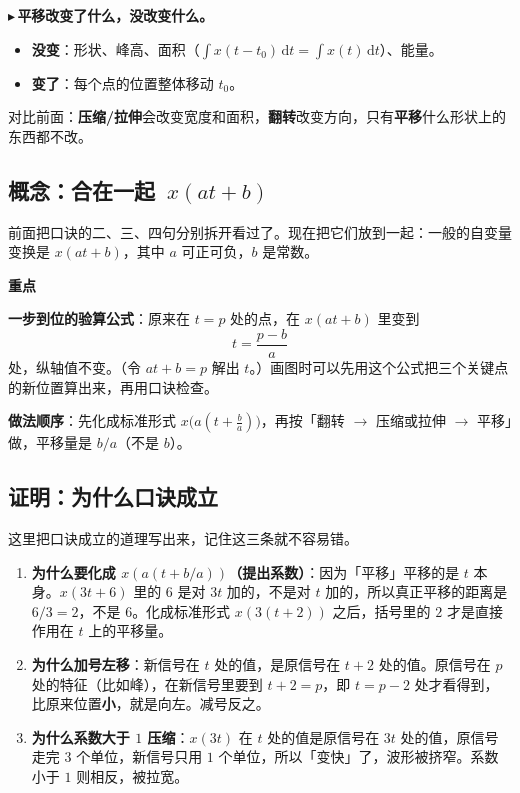 \documentclass[UTF8,a4paper,11pt]{ctexart}
\newenvironment{remember}{\begin{rememberbox}\textbf{重点}\par\smallskip}{\end{rememberbox}}
\renewcommand{\d}{\,\mathrm{d}}
\newcounter{ex}[section]
\newcommand{\point}[1]{\par\addvspace{1ex}\noindent\textcolor{ptteal}{$\blacktriangleright$\,\textbf{#1}}\ }
\renewcommand{\paragraph}[1]{\point{#1}}
\begin{document}
\paragraph{平移改变了什么，没改变什么。}
\begin{itemize}[nosep]
\item \textbf{没变}：形状、峰高、面积（$\int x(t-t_0)\d t=\int x(t)\d t$）、能量。
\item \textbf{变了}：每个点的位置整体移动 $t_0$。
\end{itemize}
对比前面：\textbf{压缩/拉伸}会改变宽度和面积，\textbf{翻转}改变方向，只有\textbf{平移}什么形状上的东西都不改。
\subsection{\texorpdfstring{概念：合在一起~$x(at+b)$}{概念：合在一起 x(at+b)}}\label{sec:combo}

前面把口诀的二、三、四句分别拆开看过了。现在把它们放到一起：一般的自变量变换是 $x(at+b)$，其中 $a$ 可正可负，$b$ 是常数。
\begin{remember}
\textbf{一步到位的验算公式}：原来在 $t=p$ 处的点，在 $x(at+b)$ 里变到
\[
t=\frac{p-b}{a}
\]
处，纵轴值不变。（令 $at+b=p$ 解出 $t$。）画图时可以先用这个公式把三个关键点的新位置算出来，再用口诀检查。
\end{remember}

\textbf{做法顺序}：先化成标准形式 $x\bigl(a(t+\tfrac ba)\bigr)$，再按「翻转 $\to$ 压缩或拉伸 $\to$ 平移」做，平移量是 $b/a$（不是 $b$）。

\subsection{证明：为什么口诀成立}\label{sec:proof}
这里把口诀成立的道理写出来，记住这三条就不容易错。

\begin{enumerate}
\item \textbf{为什么要化成 $x(a(t+b/a))$（提出系数）}：因为「平移」平移的是 $t$ 本身。$x(3t+6)$ 里的 $6$ 是对 $3t$ 加的，不是对 $t$ 加的，所以真正平移的距离是 $6/3=2$，不是 $6$。化成标准形式 $x(3(t+2))$ 之后，括号里的 $2$ 才是直接作用在 $t$ 上的平移量。
\item \textbf{为什么加号左移}：新信号在 $t$ 处的值，是原信号在 $t+2$ 处的值。原信号在 $p$ 处的特征（比如峰），在新信号里要到 $t+2=p$，即 $t=p-2$ 处才看得到，比原来位置\textbf{小}，就是向左。减号反之。
\item \textbf{为什么系数大于 $1$ 压缩}：$x(3t)$ 在 $t$ 处的值是原信号在 $3t$ 处的值，原信号走完 $3$ 个单位，新信号只用 $1$ 个单位，所以「变快」了，波形被挤窄。系数小于 $1$ 则相反，被拉宽。
\end{enumerate}
\end{document}

